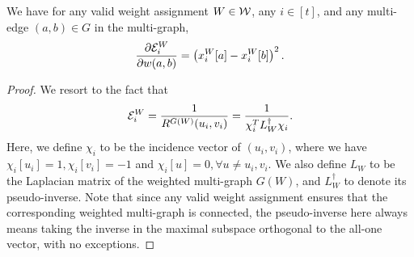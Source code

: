 \documentclass{article}
\begin{document}
\begin{proposition}
\label{prop:dr}
    We have for any valid weight assignment $W\in \mathcal{W}$,
    any $i\in[t]$, and any multi-edge $(a,b)\in G$ in the multi-graph,
    \begin{align}
        \frac{\partial \mathcal{E}^W_{i}}{\partial w(a,b)} = \left(x_{i}^W[a] - x_{i}^W[b]\right)^2.
    \end{align}
\end{proposition}
\begin{proof}
We resort to the fact that
\begin{align*}
    \mathcal{E}_i^{W} = \frac{1}{R^{G(W)}(u_i,v_i)} = 
    \frac{1}{\chi_i^T L_W^{\dag} \chi_i}.
\end{align*}
Here, we define $\chi_i$ to be the incidence vector of $(u_i,v_i)$, where
we have $\chi_i[u_i] = 1, \chi_i[v_i] = -1$ and $\chi_i[u] = 0,\forall u\neq u_i,v_i$.
We also define $L_W$ to be the Laplacian matrix of the weighted multi-graph $G(W)$,
and $L_W^{\dag}$ to denote its pseudo-inverse. Note that since any valid weight assignment ensures
that the corresponding weighted multi-graph is connected, the pseudo-inverse here always
means taking the inverse in the maximal subspace orthogonal to the all-one vector, with no
exceptions.


\end{proof}
\end{document}
